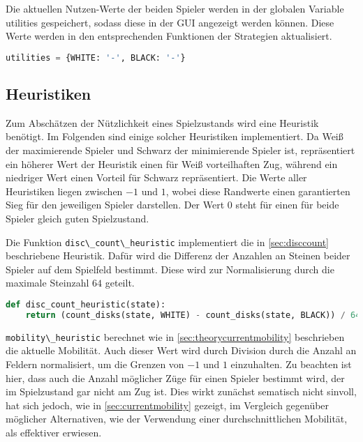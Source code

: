 Die aktuellen Nutzen-Werte der beiden Spieler werden in der globalen
Variable utilities gespeichert, sodass diese in der GUI angezeigt werden
können. Diese Werte werden in den entsprechenden Funktionen der
Strategien aktualisiert.

\begin{lstlisting}[language=Python]
utilities = {WHITE: '-', BLACK: '-'}
\end{lstlisting}

\hypertarget{heuristiken}{%
\subsection{Heuristiken}\label{heuristiken}}

Zum Abschätzen der Nützlichkeit eines Spielzustands wird eine Heuristik
benötigt. Im Folgenden sind einige solcher Heuristiken implementiert. Da
Weiß der maximierende Spieler und Schwarz der minimierende Spieler ist,
repräsentiert ein höherer Wert der Heuristik einen für Weiß
vorteilhaften Zug, während ein niedriger Wert einen Vorteil für Schwarz
repräsentiert. Die Werte aller Heuristiken liegen zwischen \(-1\) und
\(1\), wobei diese Randwerte einen garantierten Sieg für den jeweiligen
Spieler darstellen. Der Wert \(0\) steht für einen für beide Spieler
gleich guten Spielzustand.

Die Funktion \passthrough{\lstinline!disc\_count\_heuristic!}
implementiert die in \ref{sec:disccount} beschriebene Heuristik. Dafür
wird die Differenz der Anzahlen an Steinen beider Spieler auf dem
Spielfeld bestimmt. Diese wird zur Normalisierung durch die maximale
Steinzahl \(64\) geteilt.

\begin{lstlisting}[language=Python]
def disc_count_heuristic(state):
    return (count_disks(state, WHITE) - count_disks(state, BLACK)) / 64
\end{lstlisting}

\passthrough{\lstinline!mobility\_heuristic!} berechnet wie in
\ref{sec:theorycurrentmobility} beschrieben die aktuelle Mobilität. Auch
dieser Wert wird durch Division durch die Anzahl an Feldern
normalisiert, um die Grenzen von \(-1\) und \(1\) einzuhalten. Zu
beachten ist hier, dass auch die Anzahl möglicher Züge für einen Spieler
bestimmt wird, der im Spielzustand gar nicht am Zug ist. Dies wirkt
zunächst sematisch nicht sinvoll, hat sich jedoch, wie in
\ref{sec:currentmobility} gezeigt, im Vergleich gegenüber möglicher
Alternativen, wie der Verwendung einer durchschnittlichen Mobilität, als
effektiver erwiesen.

